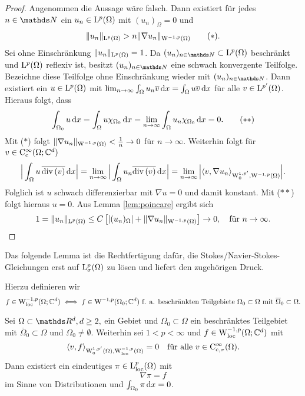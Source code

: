 \begin{proof}
  Angenommen die Aussage wäre falsch.
  Dann existiert für jedes $n \in \N$ ein $u_n \in \mathrm{L}^p(\Omega)$ mit $(u_n)_\Omega = 0$ und
  \begin{align*}
    \|u_n\|_{\mathrm{L}^p(\Omega)} > n \|\nabla u_n \|_{\mathrm{W}^{-1,p}(\Omega)} \tag{$\ast$}.
  \end{align*}
  Sei ohne Einschränkung $\|u_n\|_{\mathrm{L}^p(\Omega)} = 1$.
  Da $(u_n)_{n \in \N} \subset \Ell^p(\Omega)$ beschränkt und $\mathrm{L}^p(\Omega)$ reflexiv ist, besitzt $(u_n)_{n \in \N}$ eine schwach konvergente Teilfolge.
  Bezeichne diese Teilfolge ohne Einschränkung wieder mit $(u_n)_{n \in \N}$.
  Dann existiert ein $u \in \mathrm{L}^p(\Omega)$ mit $\lim_{n \to \infty} \int_\Omega u_n \overline v \, {\operatorname{d}\!{x}} = \int_\Omega u \overline v \, {\operatorname{d}\!{x}}$ für alle $v \in \mathrm{L}^{p'}(\Omega)$.
  Hieraus folgt, dass
  \begin{align*}
  \int_{\Omega_0} u \, {\operatorname{d}\!{x}} 
  = \int_\Omega u \chi_{\Omega_0} \, {\operatorname{d}\!{x}}
  = \lim_{n \to \infty} \int_\Omega u_n \chi_{\Omega_0} \, {\operatorname{d}\!{x}} = 0. \tag{$\ast\ast$}
  \end{align*}
  Mit ($\ast$) folgt $\|\nabla u_n\|_{\mathrm{W}^{-1,p}(\Omega)} < \frac{1}{n} \to 0$ für $n \to \infty$.
  Weiterhin folgt für $v \in \mathrm{C}_{\mathrm{c}}^\infty(\Omega;\mathbb{C}^d)$
  $$
  \Big| \int_\Omega u \, \overline{\mathrm{div\,} (v)} \, {\operatorname{d}\!{x}} \Big|
  = \lim_{n \to \infty} \Big| \int_\Omega u_n \overline{\mathrm{div\,} (v)} \, {\operatorname{d}\!{x}} \Big|
  = \lim_{n \to \infty} \Big| \langle v, \nabla u_n \rangle_{\mathrm{W}_0^{1,p'}, \mathrm{W}^{-1,p}(\Omega)} \Big|.
  $$
  Folglich ist $u$ schwach differenzierbar mit $\nabla u = 0$ und damit konstant.
  Mit ($\ast\ast$) folgt hieraus $u = 0$.
  Aus Lemma \ref{lem:poincare} ergibt sich
  \[
  1 = \|u_n\|_{\mathrm{L}^p(\Omega)}
  \leq C \left[ |(u_n)_\Omega| + \|\nabla u_n\|_{\mathrm{W}^{-1,p}(\Omega)} \right] \to 0, \quad\text{für } n \to \infty. \qedhere
  \]
\end{proof}

Das folgende Lemma ist die Rechtfertigung dafür, die Stokes/Navier-Stokes-Gleichungen erst auf $\mathrm{L}_\sigma^p(\Omega)$ zu lösen und liefert den zugehörigen Druck.

Hierzu definieren wir
$$
f \in \mathrm{W}_{\operatorname{loc}}^{-1,p}(\Omega; \mathbb{C}^d) \iff f \in \mathrm{W}^{-1,p}(\Omega_0; \mathbb{C}^d) \text{ f. a. beschränkten Teilgebiete } \Omega_0 \subset \Omega \text{ mit } \overline\Omega_0 \subset \Omega.
$$

\begin{lem}
  \label{lem:pressureGrad}
  Sei $\Omega \subset \R^d, d \geq 2,$ ein Gebiet und $\Omega_0 \subset \Omega$ ein beschränktes Teilgebiet mit $\overline\Omega_0 \subset \Omega$ und $\Omega_0 \neq \emptyset$.
  Weiterhin sei $1 < p < \infty$ und $f \in \mathrm{W}_{\operatorname{loc}}^{-1,p}(\Omega; \mathbb{C}^d)$ mit
  $$
  \langle v , f \rangle_{\mathrm{W}_0^{1,p'}(\Omega), \mathrm{W}_{\operatorname{loc}}^{-1,p}(\Omega)} = 0 \quad\text{für alle } v \in \mathrm{C}_{\mathrm{c},\sigma}^\infty(\Omega).
  $$
  Dann existiert ein eindeutiges $\pi \in \mathrm{L}^p_{\operatorname{loc}}(\Omega)$ mit
  $$
  \nabla \pi = f
  $$
  im Sinne von Distributionen und $\int_{\Omega_0} \pi \, {\operatorname{d}\!{x}} = 0$.
\end{lem}

